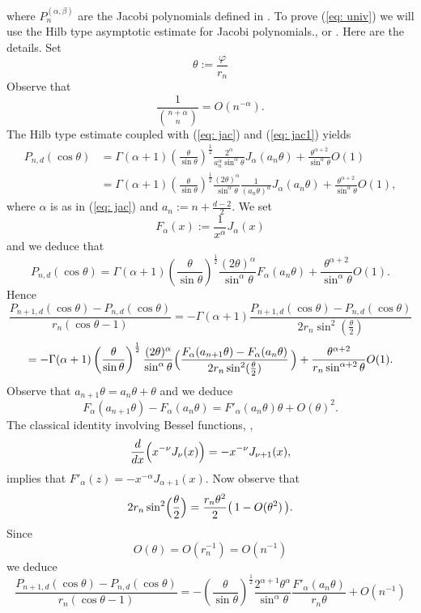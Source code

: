 \documentclass[reqno, 11pt]{amsart}
\theoremstyle{definition}
\numberwithin{equation}{section}
\begin{document}
where $P_n^{(\alpha,\beta)}$ are the Jacobi  polynomials defined in \cite[\S 4.1]{Sze}.    To prove (\ref{eq: univ})   we  will use the Hilb type  asymptotic estimate for Jacobi polynomials., \cite[Eq. (8.2.17)]{Sze} or \cite[(29)]{Rau}. Here are the details.  Set 
\[
\theta:=\frac{{\varphi}}{r_n}
\]
Observe that
\begin{equation}
\frac{1}{\binom{n+\alpha}{n}}=O(n^{-\alpha}).
\label{eq: jac1}
\end{equation}
The Hilb type estimate  \cite[Eq. (8.2.17)]{Sze}  coupled with (\ref{eq: jac})  and (\ref{eq: jac1}) yields
\[
\begin{split}
P_{n,d} (\cos \theta) & = \Gamma(\alpha+1)\left(\frac{\theta}{\sin\theta}\right)^{\frac{1}{2}}\frac{2^\alpha}{a_n^\alpha \sin^\alpha\theta} J_\alpha(a_n\theta) + \frac{\theta^{\alpha+2}}{\sin^\alpha \theta} O(1)\\
&=\Gamma(\alpha+1)\left(\frac{\theta}{\sin\theta}\right)^{\frac{1}{2}}\frac{(2\theta)^\alpha}{ \sin^\alpha\theta} \frac{1}{(a_n\theta)^{\alpha}}J_\alpha(a_n\theta) + \frac{\theta^{\alpha+2}}{\sin^\alpha \theta} O(1),
\end{split}
\]
where  $\alpha$  is as in (\ref{eq: jac}) and  $a_n:= n+\frac{d-2}{2}$. We set
\[
 F_\alpha(x):=\frac{1}{x^\alpha} J_\alpha(x)
 \]
 and we deduce that
 \[
 P_{n,d} (\cos \theta) =\Gamma(\alpha+1)\left(\frac{\theta}{\sin\theta}\right)^{\frac{1}{2}}\frac{(2\theta)^\alpha}{ \sin^\alpha\theta} F_\alpha(a_n\theta)+ \frac{\theta^{\alpha+2}}{\sin^\alpha \theta} O(1).
 \]
 Hence
 \[
 \frac{P_{n+1,d}(\cos\theta)-P_{n,d}(\cos\theta)}{r_n(\cos\theta-1)}=-\Gamma(\alpha+1)\frac{P_{n+1,d}(\cos\theta)-P_{n,d}(\cos\theta)}{2r_n\sin^2(\frac{\theta}{2})}
 \]
 \[
 =-\Gamma(\alpha+1)\left(\frac{\theta}{\sin\theta}\right)^{\frac{1}{2}}\frac{(2\theta)^\alpha}{ \sin^\alpha\theta}\Bigl( \frac{F_{\alpha}(a_{n+1}\theta) -F_\alpha(a_n\theta)}{2r_n\sin^2(\frac{\theta}{2})}\,\Bigr)+\frac{\theta^{\alpha+2}}{r_n\sin^{\alpha+2} \theta} O(1).
 \]
Observe that $a_{n+1}\theta= a_n\theta+\theta$ and we deduce 
\[
F_\alpha(a_{n+1}\theta)-F_{\alpha}(a_n\theta)= F'_\alpha(a_n\theta)\theta + O(\theta)^2.
\]
 The  classical  identity involving   Bessel functions, \cite[Eq. (4.6.2)]{AAR},
\[
\frac{d}{dx} \Bigl(x^{-\nu} J_\nu(x)\Bigr)=- x^{-\nu} J_{\nu+1}(x),
\]
implies that  $F'_\alpha(z)=-x^{-\alpha}J_{\alpha+1}(x)$. Now observe that
\[
2r_n\sin^2\Bigl(\frac{\theta}{2}\Bigr)=\frac{r_n\theta^2}{2}\bigl(\, 1- O(\theta^2)\,\bigr).
\]
Since  
\[
O(\theta)=O(r_n^{-1})=O(n^{-1})
\]
we deduce
\[
\frac{P_{n+1,d}(\cos\theta)-P_{n,d}(\cos\theta)}{r_n(\cos\theta-1)}= -\left(\frac{\theta}{\sin\theta}\right)^{\frac{1}{2}}\frac{2^{\alpha+1}\theta^\alpha}{ \sin^\alpha\theta} \frac{F'_{\alpha}(a_n\theta)}{r_n\theta} + O(n^{-1})
\]
\end{document}
